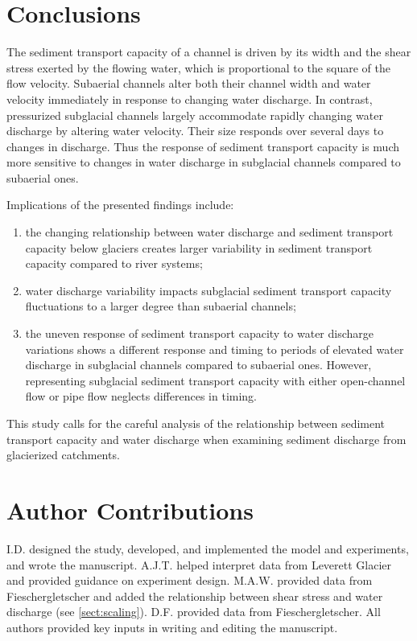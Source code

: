 \documentclass[draft]{agujournal2019}
\begin{document}
\section{Conclusions}

The sediment transport capacity of a channel is driven by its width and the shear stress exerted by the flowing water, which is proportional to the square of the flow velocity.
Subaerial channels alter both their channel width and water velocity immediately in response to changing water discharge.
In contrast, pressurized subglacial channels largely accommodate rapidly changing water discharge by altering water velocity.
Their size responds over several days to changes in discharge.
Thus the response of sediment transport capacity is much more sensitive to changes in water discharge in subglacial channels compared to subaerial ones.

Implications of the presented findings include:
\begin{enumerate}
\item the changing relationship between water discharge and sediment transport capacity below glaciers creates larger variability in sediment transport capacity compared to river systems;
  \vspace{.1cm}
 
\item
  water discharge variability impacts subglacial sediment transport capacity fluctuations to a larger degree than subaerial channels;
  \vspace{.1cm}
  
\item the uneven response of sediment transport capacity to water discharge variations shows a different response and timing to periods of elevated water discharge in subglacial channels compared to subaerial ones.
However, representing subglacial sediment transport capacity with either open-channel flow or pipe flow neglects differences in timing.
\end{enumerate}

This study calls for the careful analysis of the relationship between sediment transport capacity and water discharge when examining sediment discharge from glacierized catchments.

\section*{Author Contributions}

I.D. designed the study, developed, and implemented the model and experiments, and wrote the manuscript.
A.J.T. helped interpret data from Leverett Glacier and provided guidance on experiment design.
M.A.W. provided data from Fieschergletscher and added the relationship between shear stress and water discharge (see \ref{sect:scaling}).
D.F. provided data from Fieschergletscher.
All authors provided key inputs in writing and editing the manuscript.
\end{document}
